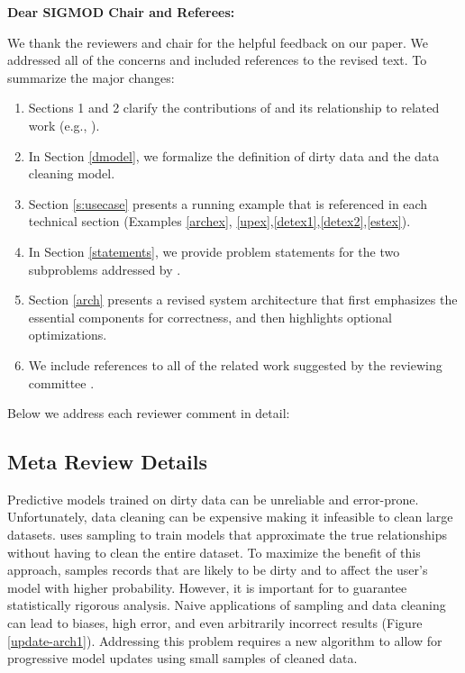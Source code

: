 {\noindent \normalsize \bf Dear SIGMOD Chair and Referees: }

\vspace{.5em}

We thank the reviewers and chair for the helpful feedback on our paper. 
We addressed all of the concerns and included references to the revised text. 
To summarize the major changes:

\begin{enumerate}
\item Sections 1 and 2 clarify the contributions of \sys and its relationship to related work (e.g., \cite{gokhale2014corleone, DBLP:journals/pvldb/YakoutENOI11, yakout2013don}).

\item In Section \ref{dmodel}, we formalize the definition of dirty data and the data cleaning model.

\item Section \ref{s:usecase} presents a running example that is referenced in each technical section (Examples \ref{archex}, \ref{upex},\ref{detex1},\ref{detex2},\ref{estex}).

\item In Section \ref{statements}, we provide problem statements for the two subproblems addressed by \sys.

\item Section \ref{arch} presents a revised system architecture that first emphasizes the essential components for correctness, and then highlights optional optimizations. 

\item We include references to all of the related work suggested by the reviewing committee \cite{whang2014incremental, papenbrock2015progressive, gruenheid2014incremental, DBLP:journals/pvldb/YakoutENOI11, yakout2013don, heise2014estimating}.

\end{enumerate}
Below we address each reviewer comment in detail:

\vspace{0.5em}

\subsection*{Meta Review Details} 
Predictive models trained on dirty data can be unreliable and error-prone.
Unfortunately, data cleaning can be expensive making it infeasible to clean large datasets.
\sys uses sampling to train models that approximate the true relationships without having to clean the entire dataset.
To maximize the benefit of this approach, \sys samples records that are likely to be dirty and to affect the user's model with higher probability.
However, it is important for \sys to guarantee statistically rigorous analysis.
Naive applications of sampling and data cleaning can lead to biases, high error, and even arbitrarily incorrect results (Figure \ref{update-arch1}).
Addressing this problem requires a new algorithm to allow for progressive model updates using small samples of cleaned data.

